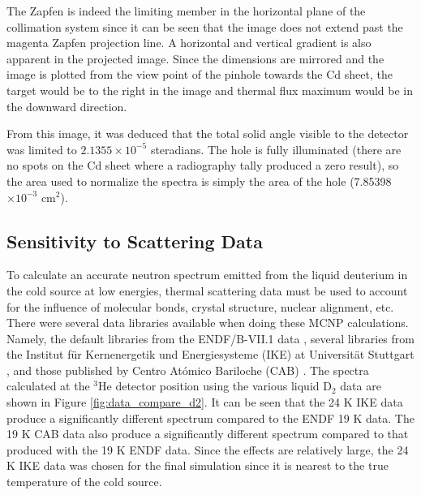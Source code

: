 \documentclass[5p,12pt]{elsarticle}
\begin{document}
The Zapfen is indeed the limiting member in the horizontal plane of the collimation system since it can be seen that the image does not extend past the magenta Zapfen projection line.  A horizontal and vertical gradient is also apparent in the projected image.  Since the dimensions are mirrored and the image is plotted from the view point of the pinhole towards the Cd sheet, the target would be to the right in the image and thermal flux maximum would be in the downward direction.

From this image, it was deduced that the total solid angle visible to the detector was limited to $2.1355\times10^{-5}$ steradians.  The hole is fully illuminated (there are no spots on the Cd sheet where a radiography tally produced a zero result), so the area used to normalize the spectra is simply the area of the hole (7.85398$\times 10^{-3}$ cm$^2$).

%
%
%
%
%

\subsection{Sensitivity to Scattering Data}
\label{subsec:data}

To calculate an accurate neutron spectrum emitted from the liquid deuterium in the cold source at low energies, thermal scattering data must be used to account for the influence of molecular bonds, crystal structure, nuclear alignment, etc.   There were several data libraries available when doing these MCNP calculations.  Namely, the default libraries from the ENDF/B-VII.1 data \cite{mcnp6}, several libraries from the Institut f\"{u}r Kernenergetik und Energiesysteme (IKE) at Universit\"{a}t Stuttgart \cite{IKE}, and those published by Centro At\'{o}mico Bariloche (CAB) \cite{granada_d2}.  The spectra calculated at the $^3$He detector position using the various liquid D$_2$ data are shown in Figure \ref{fig:data_compare_d2}.  It can be seen that the 24 K IKE data produce a significantly different spectrum compared to the ENDF 19 K data.  The 19 K CAB data also produce a significantly different spectrum compared to that produced with the 19 K ENDF data.  Since the effects are relatively large, the 24 K IKE data was chosen for the final simulation since it is nearest to the true temperature of the cold source.
\end{document}
